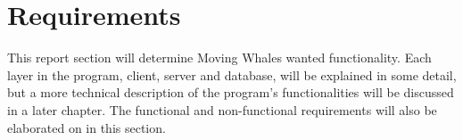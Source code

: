 \section{Requirements}

This report section will determine Moving Whales wanted functionality. 
Each layer in the program, client, server and database, 
will be explained in some detail, but a more technical description of 
the program's functionalities will be discussed in a later chapter. 
The functional and non-functional requirements will also be elaborated on in 
this section.



